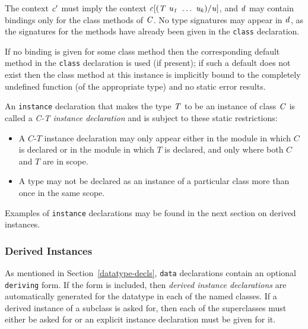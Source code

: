 The context \mbox{$\it c'$} must
imply the context \mbox{$\it c[(T\ u_1\ \ldots \ u_k)/u]$}, and \mbox{$\it d$} may contain bindings
only for the class methods of \mbox{$\it C$}.  No type signatures
 may appear in \mbox{$\it d$}, as the signatures for the
methods have already been given in the \mbox{\tt class} declaration.


If no binding is given for some class method then the
corresponding default method
in the \mbox{\tt class} declaration is used (if
present); if such a default does
not exist then the class method at this instance
is implicitly bound to the completely undefined
function (of the appropriate type) and no static error results.

An \mbox{\tt instance} declaration that makes the type \mbox{$\it T$} to be an instance
of class \mbox{$\it C$} is called a {\em C-T instance declaration}
 and is
subject to these static restrictions:
\begin{itemize}
\item A $C$-$T$ instance declaration may only appear either in the module
in which $C$ is declared or in the module in which $T$ is declared, and
only where both $C$ and $T$ are in scope.

\item A type may not be declared as an instance of a
particular class more than once in the same scope.
\end{itemize}

Examples of \mbox{\tt instance} declarations may be found in the next section on
derived instances.  

\subsubsection{Derived Instances}
\label{derived-decls}

As mentioned in Section~\ref{datatype-decls}, \mbox{\tt data} declarations
contain an optional \mbox{\tt deriving} form.  If the form is included, then
{\em derived instance declarations} are automatically generated for
the datatype in each of the named classes.
If a derived instance of a subclass is asked
for, then each of the superclasses must either be asked for or an
explicit instance declaration must be given for it.

